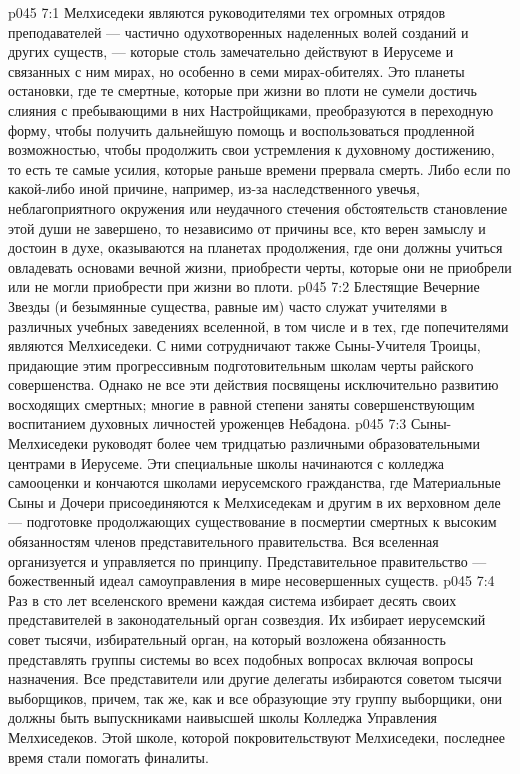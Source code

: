 \vs p045 7:1 Мелхиседеки являются руководителями тех огромных отрядов преподавателей --- частично одухотворенных наделенных волей созданий и других существ, --- которые столь замечательно действуют в Иерусеме и связанных с ним мирах, но особенно в семи мирах\hyp{}обителях. Это планеты остановки, где те смертные, которые при жизни во плоти не сумели достичь слияния с пребывающими в них Настройщиками, преобразуются в переходную форму, чтобы получить дальнейшую помощь и воспользоваться продленной возможностью, чтобы продолжить свои устремления к духовному достижению, то есть те самые усилия, которые раньше времени прервала смерть. Либо если по какой\hyp{}либо иной причине, например, из\hyp{}за наследственного увечья, неблагоприятного окружения или неудачного стечения обстоятельств становление этой души не завершено, то независимо от причины все, кто верен замыслу и достоин в духе, оказываются на планетах продолжения, где они должны учиться овладевать основами вечной жизни, приобрести черты, которые они не приобрели или не могли приобрести при жизни во плоти.
\vs p045 7:2 Блестящие Вечерние Звезды (и безымянные существа, равные им) часто служат учителями в различных учебных заведениях вселенной, в том числе и в тех, где попечителями являются Мелхиседеки. С ними сотрудничают также Сыны\hyp{}Учителя Троицы, придающие этим прогрессивным подготовительным школам черты райского совершенства. Однако не все эти действия посвящены исключительно развитию восходящих смертных; многие в равной степени заняты совершенствующим воспитанием духовных личностей уроженцев Небадона.
\vs p045 7:3 Сыны\hyp{}Мелхиседеки руководят более чем тридцатью различными образовательными центрами в Иерусеме. Эти специальные школы начинаются с колледжа самооценки и кончаются школами иерусемского гражданства, где Материальные Сыны и Дочери присоединяются к Мелхиседекам и другим в их верховном деле --- подготовке продолжающих существование в посмертии смертных к высоким обязанностям членов представительного правительства. Вся вселенная организуется и управляется по  принципу. Представительное правительство --- божественный идеал самоуправления в мире несовершенных существ.
\vs p045 7:4 Раз в сто лет вселенского времени каждая система избирает десять своих представителей в законодательный орган созвездия. Их избирает иерусемский совет тысячи, избирательный орган, на который возложена обязанность представлять группы системы во всех подобных вопросах включая вопросы назначения. Все представители или другие делегаты избираются советом тысячи выборщиков, причем, так же, как и все образующие эту группу выборщики, они должны быть выпускниками наивысшей школы Колледжа Управления Мелхиседеков. Этой школе, которой покровительствуют Мелхиседеки, последнее время стали помогать финалиты.

